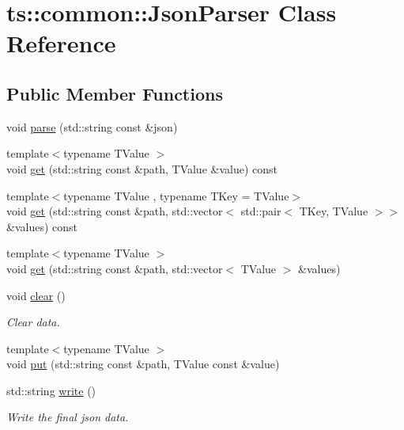 \hypertarget{classts_1_1common_1_1_json_parser}{}\section{ts\+:\+:common\+:\+:Json\+Parser Class Reference}
\label{classts_1_1common_1_1_json_parser}
\subsection*{Public Member Functions}
\begin{DoxyCompactItemize}
\item 
void \hyperlink{classts_1_1common_1_1_json_parser_abba008df015d4baad7d03f0a03862ff9}{parse} (std\+::string const \&json)
\item 
{\footnotesize template$<$typename T\+Value $>$ }\\void \hyperlink{classts_1_1common_1_1_json_parser_a08607becc24052fb2c08cf583ac9b735}{get} (std\+::string const \&path, T\+Value \&value) const
\item 
{\footnotesize template$<$typename T\+Value , typename T\+Key  = T\+Value$>$ }\\void \hyperlink{classts_1_1common_1_1_json_parser_a3422774a1df58bbb3de563872f2d3841}{get} (std\+::string const \&path, std\+::vector$<$ std\+::pair$<$ T\+Key, T\+Value $>$$>$ \&values) const
\item 
{\footnotesize template$<$typename T\+Value $>$ }\\void \hyperlink{classts_1_1common_1_1_json_parser_aea9fd5f7744ff6a97075ebdb674f54df}{get} (std\+::string const \&path, std\+::vector$<$ T\+Value $>$ \&values)
\item 
\mbox{\label{classts_1_1common_1_1_json_parser_a5397245ead2a54678856731f7a126f31}} 
void \hyperlink{classts_1_1common_1_1_json_parser_a5397245ead2a54678856731f7a126f31}{clear} ()
\begin{DoxyCompactList}\small\item\em Clear data. \end{DoxyCompactList}\item 
{\footnotesize template$<$typename T\+Value $>$ }\\void \hyperlink{classts_1_1common_1_1_json_parser_acfb81f9e2bce7073b4f550b4cb99d21e}{put} (std\+::string const \&path, T\+Value const \&value)
\item 
\mbox{\label{classts_1_1common_1_1_json_parser_acaa4bbc3d9de1c54c833282410f4152d}} 
std\+::string \hyperlink{classts_1_1common_1_1_json_parser_acaa4bbc3d9de1c54c833282410f4152d}{write} ()
\begin{DoxyCompactList}\small\item\em Write the final json data. \end{DoxyCompactList}\end{DoxyCompactItemize}



